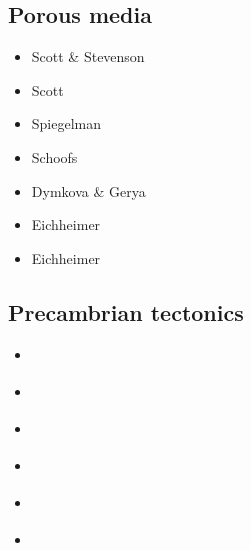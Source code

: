 \subsection{Porous media} 

\begin{scriptsize}
\begin{itemize}
\item[\nineteeneightysix] Scott \& Stevenson \cite{scst86}
\item[\nineteeneightyeight] Scott \cite{scot88}
\item[\nineteenninetythree] Spiegelman \cite{spie93}
\item[\twothousand] Schoofs \etal \cite{scth00b}
\item[\twothousandthirteen] Dymkova \& Gerya \cite{dyge13}
\item[\twothousandnineteen] Eichheimer \etal \cite{eitp19}
\item[\twothousandtwenty] Eichheimer \etal \cite{eitf20}
\end{itemize}
\end{scriptsize}

\subsection{Precambrian tectonics}

\begin{scriptsize}
\begin{itemize}
\item[\nineteenninetyfour] \cite{guto94}
\item[\twothousandthree] \cite{wemv03}
\item[\twothousandten] \cite{sigb10}
\item[\twothousandeleven] \cite{pege11}
\item[\twothousandfourteen] \cite{gery14}\cite{gagb14}\cite{sigb14}
\item[\twothousandtwenty] \cite{poyd20}
\end{itemize}
\end{scriptsize}

